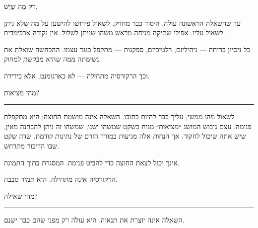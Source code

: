 \documentclass[10pt, openany, oneside]{book}
\begin{document}
\vspace{0.5em}

רק מַה שֶׁיֵּשׁ.

\vspace{1em}

\noindent עד שהשאלה הראשונה עולה, היסוד כבר מחזיק. לשאול פירושו להישען על מה שלא ניתן לשאול עליו. אפילו שתיקה מניחה מראש משהו שניתן לשלול. אין נקודה ארכימדית.

\vspace{0.5em}

\noindent כל ניסיון בריחה — ניהיליזם, רלטיביזם, ספקנות — מתקפל כנגד עצמו. ההכחשה שואלת את נשימתה ממה שהיא מבקשת למחוק.

\vspace{0.5em}

\noindent וכך הרקורסיה מתחילה — לא כארגומנט, אלא כירידה.

\vspace{2em}

\begin{center}
    {\textsc{מהי מציאות?}}\\[0.3em]
    \rule{0.2\textwidth}{0.3pt}
\end{center}

\vspace{1em}

\noindent לשאול מהו ממשי, עליך כבר להיות בתוכו. השאלה אינה מושטת החוצה; היא מתקפלת פנימה. עצם גיבוש המושג ״מציאות״ מניח בשקט שמשהו ישנו, שמשהו זה ניתן להבחנה מאין, שיש אתה שיכול לחקור. אך הנחות אלה מגיעות במורד הזרם של נתינות קודמת, שדה שקט שבו הדיבור מתרחש.

\vspace{0.5em}

\noindent אינך יכול לצאת החוצה כדי להביט פנימה. המסגרת בתוך התמונה.

\vspace{0.5em}

\noindent הרקורסיה אינה מתחילה. היא תמיד סבבה.

\vspace{2em}

\begin{center}
    {\textsc{מהי שאילה?}}\\[0.3em]
    \rule{0.2\textwidth}{0.3pt}
\end{center}

\vspace{1em}

\noindent השאלה אינה יוצרת את תנאיה. היא עולה רק מפני שהם כבר ישנם.

\vspace{0.5em}
\end{document}
